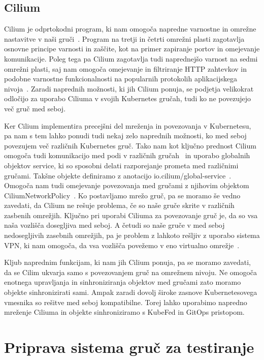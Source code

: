 \documentclass[a4paper, 12pt]{book}
\begin{document}
\section{Cilium}
Cilium je odprtokodni program, ki nam omogoča napredne varnostne in omrežne nastavitve v naši gruči~\cite{cilium-intro}.
Program na tretji in četrti omrežni plasti zagotavlja osnovne principe varnosti in zaščite, kot na primer zapiranje portov in omejevanje komunikacije.
Poleg tega pa Cilium zagotavlja tudi naprednejšo varnost na sedmi omrežni plasti, saj nam omogoča omejevanje in filtriranje HTTP zahtevkov in podobne varnostne funkcionalnosti na popularnih protokolih aplikacijskega nivoja~\cite{cilium-intro}.
Zaradi naprednih možnosti, ki jih Cilium ponuja, se podjetja velikokrat odločijo za uporabo Ciliuma v svojih Kubernetes gručah, tudi ko ne povezujejo več gruč med seboj.

Ker Cilium implementira precejšni del mreženja in povezovanja v Kubernetesu, pa nam s tem lahko ponudi tudi nekaj zelo naprednih možnosti, ko med seboj povezujem več različnih Kubernetes gruč.
Tako nam kot ključno prednost Cilium omogoča tudi komunikacijo med podi v različnih gručah~\cite{cilium-cluster-mesh} in uporabo globalnih objektov service, ki so sposobni delati razporejanje prometa med različnimi gručami.
Takšne objekte definiramo z anotacijo io.cilium/global-service~\cite{setup-cilium-cluster-mesh}.
Omogoča nam tudi omejevanje povezovanja med gručami z njihovim objektom CiliumNetworkPolicy~\cite{setup-cilium-cluster-mesh}.
Ko postavljamo mrežo gruč, pa se moramo še vedno zavedati, da Cilium ne rešuje problema, če so naše gruče skrite v različnih zasbenih omrežjih.
Ključno pri uporabi Ciliuma za povezovanje gruč je, da so vsa naša vozlišča dosegljiva med seboj.
A četudi so naše gruče v med seboj nedosegljivih zasebnih omrežjih, pa je problem z lahkoto rešljiv z uporabo sistema VPN, ki nam omogoča, da vsa vozlišča povežemo v eno virtualno omrežje~\cite{setup-cilium-cluster-mesh}.

Kljub naprednim funkcijam, ki nam jih Cilium ponuja, pa se moramo zavedati, da se Cilim ukvarja samo s povezovanjem gruč na omrežnem nivoju.
Ne omogoča enotnega upravljanja in sinhroniziranja objektov med gručami zato moramo objekte sinhronizirati sami.
Ampak zaradi dovolj široke zasnove Kubernetesovega vmesnika so rešitve med seboj kompatibilne.
Torej lahko uporabimo napredno mreženje Ciliuma in objekte sinhroniziramo s KubeFed in GitOps pristopom.
\chapter{Priprava sistema gruč za testiranje}
\end{document}
